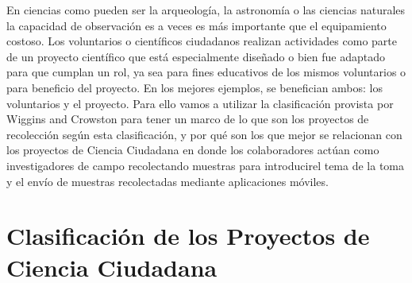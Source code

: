	En ciencias como pueden ser la arqueología, la astronomía o las ciencias naturales la capacidad de observación es a veces es más importante que el equipamiento costoso. Los voluntarios o científicos ciudadanos realizan actividades como parte de un proyecto científico que está especialmente diseñado o bien fue adaptado para que cumplan un rol, ya sea para fines educativos de los mismos voluntarios o para beneficio del proyecto. En los mejores ejemplos, se benefician ambos: los voluntarios y el proyecto.\cite{silvertown2009new}
	Para ello vamos a utilizar la clasificación provista por Wiggins and Crowston para tener un marco de lo que son los proyectos de recolección según esta clasificación, y por qué son los que mejor se relacionan con los proyectos de Ciencia Ciudadana en donde los colaboradores actúan como investigadores de campo recolectando muestras para introducirel tema de la toma y el envío de muestras recolectadas mediante aplicaciones móviles.	

\section{Clasificación de los Proyectos de Ciencia Ciudadana}	

